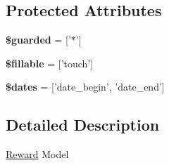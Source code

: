 \subsection*{Protected Attributes}
\begin{DoxyCompactItemize}
\item 
\hypertarget{classDMA_1_1Friends_1_1Models_1_1Reward_ad1df3ebe52db8869899e29a8de5cd70d}{{\bfseries \$guarded} = \mbox{[}'$\ast$'\mbox{]}}\label{classDMA_1_1Friends_1_1Models_1_1Reward_ad1df3ebe52db8869899e29a8de5cd70d}

\item 
\hypertarget{classDMA_1_1Friends_1_1Models_1_1Reward_ae268c0f08d1cccacf8655b5028739c87}{{\bfseries \$fillable} = \mbox{[}'touch'\mbox{]}}\label{classDMA_1_1Friends_1_1Models_1_1Reward_ae268c0f08d1cccacf8655b5028739c87}

\item 
\hypertarget{classDMA_1_1Friends_1_1Models_1_1Reward_acbc452b5aadbb75acadf961a85bbc448}{{\bfseries \$dates} = \mbox{[}'date\+\_\+begin', 'date\+\_\+end'\mbox{]}}\label{classDMA_1_1Friends_1_1Models_1_1Reward_acbc452b5aadbb75acadf961a85bbc448}

\end{DoxyCompactItemize}


\subsection{Detailed Description}
\hyperlink{classDMA_1_1Friends_1_1Models_1_1Reward}{Reward} Model 

